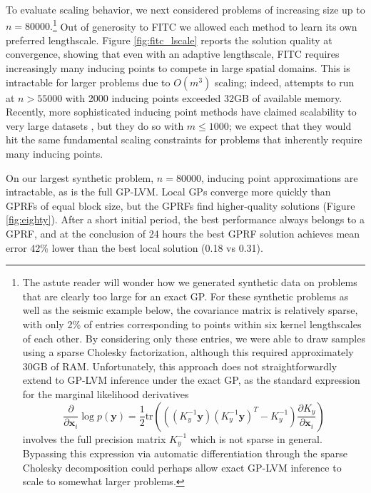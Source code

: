 \documentclass{article}
\newcommand{\tr}{\text{tr}}
\renewcommand{\v}[1]{\mathbf{#1}}
\begin{document}
To evaluate scaling behavior, we next considered problems of
increasing size up to $n=80000.$\footnote{The astute reader will wonder how we generated
  synthetic data on problems that are clearly too large for an exact
  GP. For these synthetic problems as well as the seismic example below, the
  covariance matrix is relatively sparse, with only 2\% of entries
  corresponding to points within six kernel lengthscales of each other. By considering only these
  entries, we were able to draw samples using a sparse Cholesky
  factorization, although this required approximately 30GB of RAM. Unfortunately, this approach does not straightforwardly
  extend to GP-LVM inference under the exact GP, as the standard
  expression for the marginal likelihood
  derivatives \[\frac{\partial}{\partial \v{x}_{i}} \log p(\v{y})
  = \frac{1}{2} \tr\left( \left((K_y^{-1} \v{y}) (K_y^{-1} \v{y})^T -
      K_y^{-1}\right) \frac{\partial K_y}{\partial \v{x}_{i}} \right)\] involves the full
  precision matrix $K_y^{-1}$ which is not sparse in general. Bypassing this expression via 
  automatic differentiation through the sparse Cholesky
  decomposition could perhaps allow exact GP-LVM inference to scale to
  somewhat larger problems.} Out of generosity to FITC we allowed each method to learn
its own preferred lengthscale. Figure \ref{fig:fitc_lscale}
reports the solution quality at convergence, showing that even with an
adaptive lengthscale, FITC requires increasingly many inducing points
to compete in large spatial domains. This is intractable for larger
problems due to $O(m^3)$ scaling; indeed, attempts to run at $n>55000$
with 2000 inducing points exceeded 32GB of available memory. Recently,
more sophisticated inducing point methods have claimed scalability to very large
datasets \cite{hensman2013gaussian, gal2014distributed}, but they do
so with $m\le 1000$; we expect that
they would hit the same fundamental scaling constraints for problems
that inherently require many inducing points. 

On our largest synthetic problem, $n=80000$, inducing point
approximations are intractable, as is the full GP-LVM. Local GPs converge more quickly
than GPRFs of equal block size, but the GPRFs find higher-quality
solutions (Figure \ref{fig:eighty}). After a short initial period, the
best performance always belongs to a GPRF, and at the conclusion of 24 hours the best GPRF
solution achieves mean error 42\% lower than the best local
solution (0.18 vs 0.31).
\end{document}
